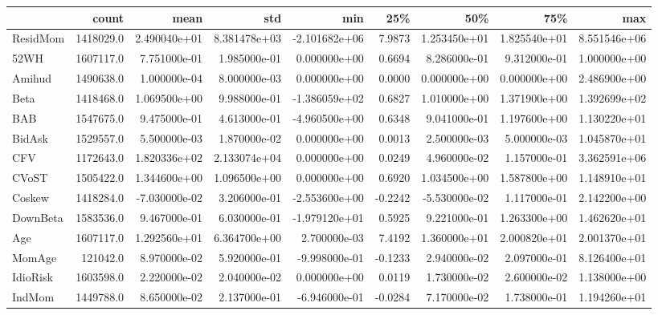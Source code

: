 \begin{tabular}{lrrrrrrrr}
\toprule
{} &      count &          mean &           std &           min &          25\% &           50\% &           75\% &           max \\
\midrule
ResidMom   &  1418029.0 &  2.490040e+01 &  8.381478e+03 & -2.101682e+06 &       7.9873 &  1.253450e+01 &  1.825540e+01 &  8.551546e+06 \\
52WH       &  1607117.0 &  7.751000e-01 &  1.985000e-01 &  0.000000e+00 &       0.6694 &  8.286000e-01 &  9.312000e-01 &  1.000000e+00 \\
Amihud     &  1490638.0 &  1.000000e-04 &  8.000000e-03 &  0.000000e+00 &       0.0000 &  0.000000e+00 &  0.000000e+00 &  2.486900e+00 \\
Beta       &  1418468.0 &  1.069500e+00 &  9.988000e-01 & -1.386059e+02 &       0.6827 &  1.010000e+00 &  1.371900e+00 &  1.392699e+02 \\
BAB        &  1547675.0 &  9.475000e-01 &  4.613000e-01 & -4.960500e+00 &       0.6348 &  9.041000e-01 &  1.197600e+00 &  1.130220e+01 \\
BidAsk     &  1529557.0 &  5.500000e-03 &  1.870000e-02 &  0.000000e+00 &       0.0013 &  2.500000e-03 &  5.000000e-03 &  1.045870e+01 \\
CFV        &  1172643.0 &  1.820336e+02 &  2.133074e+04 &  0.000000e+00 &       0.0249 &  4.960000e-02 &  1.157000e-01 &  3.362591e+06 \\
CVoST      &  1505422.0 &  1.344600e+00 &  1.096500e+00 &  0.000000e+00 &       0.6920 &  1.034500e+00 &  1.587800e+00 &  1.148910e+01 \\
Coskew     &  1418284.0 & -7.030000e-02 &  3.206000e-01 & -2.553600e+00 &      -0.2242 & -5.530000e-02 &  1.117000e-01 &  2.142200e+00 \\
DownBeta   &  1583536.0 &  9.467000e-01 &  6.030000e-01 & -1.979120e+01 &       0.5925 &  9.221000e-01 &  1.263300e+00 &  1.462620e+01 \\
Age        &  1607117.0 &  1.292560e+01 &  6.364700e+00 &  2.700000e-03 &       7.4192 &  1.360000e+01 &  2.000820e+01 &  2.001370e+01 \\
MomAge     &   121042.0 &  8.970000e-02 &  5.920000e-01 & -9.998000e-01 &      -0.1233 &  2.940000e-02 &  2.097000e-01 &  8.126400e+01 \\
IdioRisk   &  1603598.0 &  2.220000e-02 &  2.040000e-02 &  0.000000e+00 &       0.0119 &  1.730000e-02 &  2.600000e-02 &  1.138000e+00 \\
IndMom     &  1449788.0 &  8.650000e-02 &  2.137000e-01 & -6.946000e-01 &      -0.0284 &  7.170000e-02 &  1.738000e-01 &  1.194260e+01 \\

\end{tabular}
